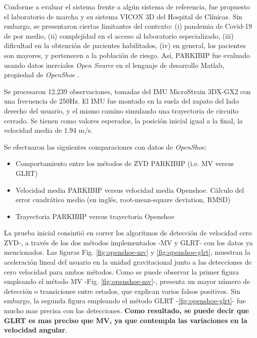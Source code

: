 Conforme a evaluar el sistema frente a algún sistema de referencia, fue propuesto el laboratorio de marcha y su sistema VICON 3D del Hospital de Clínicas. Sin embargo, se presentaron ciertas limitantes del contexto: (i) pandemia de Covid-19 de por medio, (ii) complejidad en el acceso al laboratorio especializado, (iii) dificultad en la obtención de pacientes habilitados, (iv) en general, los pacientes son mayores, y pertenecen a la población de riesgo. Así, PARKIBIP fue evaluado usando datos inerciales \textit{Open Source} en el lenguaje de desarrollo Matlab, propiedad de \textit{OpenShoe} \cite{openshoe}.

Se procesaron 12.239 observaciones, tomadas del IMU  MicroStrain 3DX-GX2 con una frecuencia de 250Hz. El IMU fue montado en la suela del zapato del lado derecho del usuario, y el mismo camino simulando una trayectoria de circuito cerrado. Se tienen como valores esperados, la posición inicial igual a la final, la velocidad media de 1.94 m/s.

Se efectuaron las siguientes comparaciones con datos de \textit{OpenShoe}:
\begin{itemize}
    \item Comportamiento entre los métodos de ZVD PARKIBIP (i.e. MV versus GLRT)
    \item Velocidad media PARKIBIP versus velocidad media Openshoe. Cálculo del error cuadrático medio (en inglés, root-mean-square deviation, RMSD)
    \item Trayectoria PARKIBIP versus trayectoria Openshoe
\end{itemize}

La prueba inicial consintió en correr los algoritmos de detección de velocidad cero ZVD-, a través de los dos métodos implementados -MV y GLRT- con los datos ya mencionados. Las figuras Fig. \ref{fig:openshoe-mv} y \ref{fig:openshoe-glrt}, muestran la aceleración lineal del usuario en la unidad gravitacional junto a las detecciones de cero velocidad para ambos métodos. Como se puede observar la primer figura empleando el método MV -Fig. \ref{fig:openshoe-mv}-, presenta un mayor número de detección o transiciones entre estados, que explican varios falsos positivos. Sin embargo, la segunda figura empleando el método GLRT -\ref{fig:openshoe-glrt}- fue mucho mas precisa con las detecciones. \textbf{Como resultado, se puede decir que GLRT es mas preciso que MV, ya que contempla las variaciones en la velocidad angular}.

